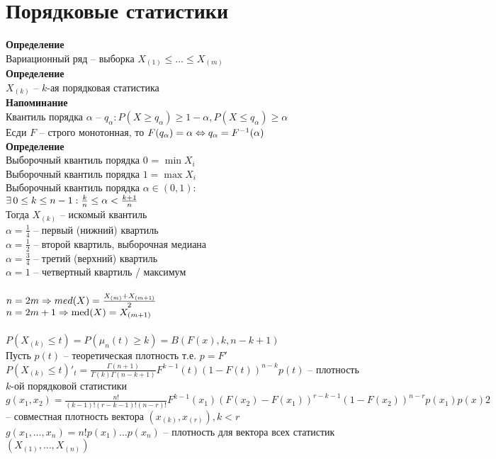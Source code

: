 \documentclass[12pt]{article}
\begin{document}
\section{Порядковые статистики}
\textbf{Определение}\\
Вариационный ряд -- выборка $X_{(1)} \leq \ldots \leq X_{(m)}$\\
\textbf{Определение}\\
$X_{(k)}$ -- $k$-ая порядковая статистика\\
\textbf{Напоминание}\\
Квантиль порядка $\alpha$ -- $q_\alpha: P(X \geq q_\alpha) \geq 1 - \alpha, P(X \leq q_\alpha) \geq \alpha$\\
Есди $F$ -- строго монотонная, то $F(q_\alpha) = \alpha \Leftrightarrow q_\alpha = F^{-1}(\alpha)$\\
\textbf{Определение}\\
Выборочный квантиль порядка $0$ = $\min X_i$\\
Выборочный квантиль порядка $1 = \max X_i$\\
Выборочный квантиль порядка $\alpha \in (0, 1)$:\\
$\exists\, 0 \leq k \leq n-1: \frac kn \leq \alpha < \frac{k+1}n$\\
Тогда $X_{(k)}$ -- искомый квантиль\\
$\alpha = \frac14$ -- первый (нижний) квартиль\\
$\alpha = \frac12$ -- второй квартиль, выборочная медиана\\
$\alpha = \frac34$ -- третий (верхний) квартиль\\
$\alpha = 1$ -- четвертный квартиль / максимум\\\\
$n = 2m \Rightarrow med(X) = \frac{X_{(m)} + X_{(m + 1)}}2$\\
$n = 2m + 1 \Rightarrow \operatorname{med}(X) = X_{(m+1)}$\\\\
$P(X_{(k)}\leq t) = P(\mu_n(t) \geq k) = B(F(x), k, n - k + 1)$\\
Пусть $p(t)$ -- теоретическая плотность т.е. $p = F'$\\
$P(X_{(k)} \leq t)'_t = \frac{\Gamma(n+1)}{\Gamma(k)\Gamma(n-k+1)} F^{k-1}(t)(1-F(t))^{n-k}p(t)$ -- плотность $k$-ой порядковой статистики\\
$g(x_1, x_2) = \frac{n!}{(k-1)!(r-k-1)!(n-r)!}F^{k-1}(x_1)(F(x_2)-F(x_1))^{r-k-1}(1-F(x_2))^{n-r}p(x_1)p(x)2$ -- совместная плотность вектора $(x_{(k)}, x_{(r)}), k < r$\\
$g(x_1, \ldots, x_n) = n!p(x_1)\ldots p(x_n)$ -- плотность для вектора всех статистик $(X_{(1)}, \ldots, X_{(n)})$\\
\end{document}
